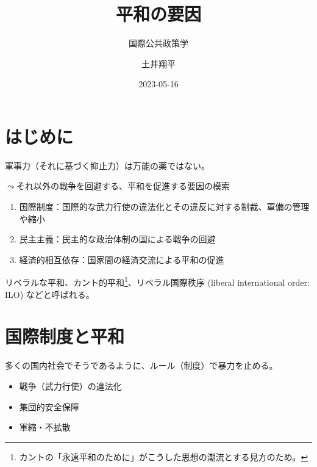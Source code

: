 \documentclass[
  xelatex,
  ja=standard]{bxjsarticle}
\title{平和の要因}
\subtitle{国際公共政策学}
\author{土井翔平}
\date{2023-05-16}
\providecommand{\tightlist}{%
  \setlength{\itemsep}{0pt}\setlength{\parskip}{0pt}}\usepackage{longtable,booktabs,array}
\begin{document}
\maketitle
\ifdefined\Shaded\renewenvironment{Shaded}{\begin{tcolorbox}[interior hidden, enhanced, frame hidden, sharp corners, borderline west={3pt}{0pt}{shadecolor}, breakable, boxrule=0pt]}{\end{tcolorbox}}\fi

\hypertarget{ux306fux3058ux3081ux306b}{%
\section*{はじめに}\label{ux306fux3058ux3081ux306b}}

軍事力（それに基づく抑止力）は万能の薬ではない。

\(\leadsto\)それ以外の戦争を回避する、平和を促進する要因の模索

\begin{enumerate}
\def\labelenumi{\arabic{enumi}.}
\tightlist
\item
  国際制度：国際的な武力行使の違法化とその違反に対する制裁、軍備の管理や縮小
\item
  民主主義：民主的な政治体制の国による戦争の回避
\item
  経済的相互依存：国家間の経済交流による平和の促進
\end{enumerate}

リベラルな平和、カント的平和\citep{oneal1997, oneal1999}\footnote{カントの「永遠平和のために」がこうした思想の潮流とする見方のため。}、リベラル国際秩序
(liberal international order: ILO)
\citep{ikenberry2009, ikenberry2018}などと呼ばれる。

\hypertarget{ux56fdux969bux5236ux5ea6ux3068ux5e73ux548c}{%
\section{国際制度と平和}\label{ux56fdux969bux5236ux5ea6ux3068ux5e73ux548c}}

多くの国内社会でそうであるように、ルール（制度）で暴力を止める。

\begin{itemize}
\tightlist
\item
  戦争（武力行使）の違法化
\item
  集団的安全保障
\item
  軍縮・不拡散
\end{itemize}
\end{document}
